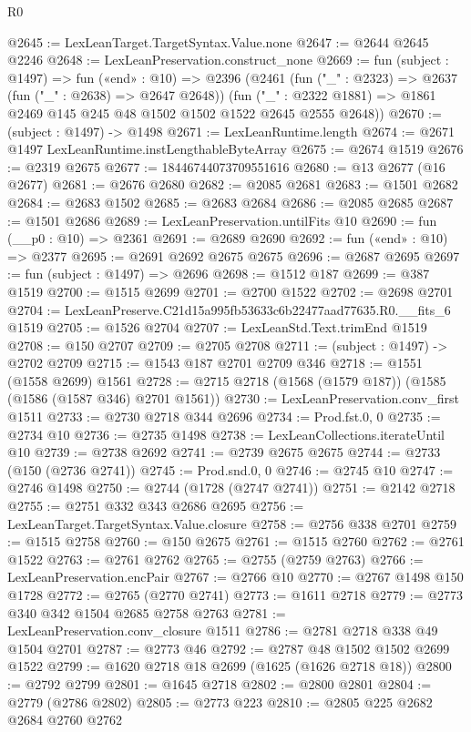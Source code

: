 \begin{lexlean}{R0}
\begin{coremodule}
@2645 := LexLeanTarget.TargetSyntax.Value.none
@2647 := @2644 @2645 @2246
@2648 := LexLeanPreservation.construct_none
@2669 := fun (subject : @1497) =>
  fun («end» : @10) =>
  @2396
    (@2461
      (fun ("_" : @2323) => @2637 (fun ("_" : @2638) => @2647 @2648))
      (fun ("_" : @2322 @1881) => @1861 @2469 @145 @245 @48 @1502 @1502 @1522 @2645 @2555 @2648))
@2670 := (subject : @1497) -> @1498
@2671 := LexLeanRuntime.length
@2674 := @2671 @1497 LexLeanRuntime.instLengthableByteArray
@2675 := @2674 @1519
@2676 := @2319 @2675
@2677 := 18446744073709551616
@2680 := @13 @2677 (@16 @2677)
@2681 := @2676 @2680
@2682 := @2085 @2681
@2683 := @1501 @2682
@2684 := @2683 @1502
@2685 := @2683 @2684
@2686 := @2085 @2685
@2687 := @1501 @2686
@2689 := LexLeanPreservation.untilFits @10
@2690 := fun (__p0 : @10) => @2361
@2691 := @2689 @2690
@2692 := fun («end» : @10) => @2377
@2695 := @2691 @2692 @2675 @2675
@2696 := @2687 @2695
@2697 := fun (subject : @1497) => @2696
@2698 := @1512 @187
@2699 := @387 @1519
@2700 := @1515 @2699
@2701 := @2700 @1522
@2702 := @2698 @2701
@2704 := LexLeanPreserve.C21d15a995fb53633c6b22477aad77635.R0.__fits_6 @1519
@2705 := @1526 @2704
@2707 := LexLeanStd.Text.trimEnd @1519
@2708 := @150 @2707
@2709 := @2705 @2708
@2711 := (subject : @1497) -> @2702 @2709
@2715 := @1543 @187 @2701 @2709 @346
@2718 := @1551 (@1558 @2699) @1561
@2728 := @2715 @2718 (@1568 (@1579 @187)) (@1585 (@1586 (@1587 @346) @2701 @1561))
@2730 := LexLeanPreservation.conv_first @1511
@2733 := @2730 @2718 @344 @2696
@2734 := Prod.fst.{0, 0}
@2735 := @2734 @10
@2736 := @2735 @1498
@2738 := LexLeanCollections.iterateUntil @10
@2739 := @2738 @2692
@2741 := @2739 @2675 @2675
@2744 := @2733 (@150 (@2736 @2741))
@2745 := Prod.snd.{0, 0}
@2746 := @2745 @10
@2747 := @2746 @1498
@2750 := @2744 (@1728 (@2747 @2741))
@2751 := @2142 @2718
@2755 := @2751 @332 @343 @2686 @2695
@2756 := LexLeanTarget.TargetSyntax.Value.closure
@2758 := @2756 @338 @2701
@2759 := @1515 @2758
@2760 := @150 @2675
@2761 := @1515 @2760
@2762 := @2761 @1522
@2763 := @2761 @2762
@2765 := @2755 (@2759 @2763)
@2766 := LexLeanPreservation.encPair
@2767 := @2766 @10
@2770 := @2767 @1498 @150 @1728
@2772 := @2765 (@2770 @2741)
@2773 := @1611 @2718
@2779 := @2773 @340 @342 @1504 @2685 @2758 @2763
@2781 := LexLeanPreservation.conv_closure @1511
@2786 := @2781 @2718 @338 @49 @1504 @2701
@2787 := @2773 @46
@2792 := @2787 @48 @1502 @1502 @2699 @1522
@2799 := @1620 @2718 @18 @2699 (@1625 (@1626 @2718 @18))
@2800 := @2792 @2799
@2801 := @1645 @2718
@2802 := @2800 @2801
@2804 := @2779 (@2786 @2802)
@2805 := @2773 @223
@2810 := @2805 @225 @2682 @2684 @2760 @2762

\end{coremodule}
\end{lexlean}
